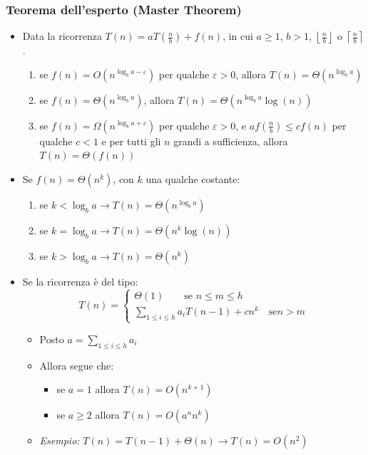 \documentclass[10pt,a4paper]{article}
\begin{document}
\subsubsection*{Teorema dell'esperto (Master Theorem)}
\begin{itemize}
    \item Data la ricorrenza $T(n) = aT(\frac{n}{b}) + f(n)$, in cui $a\ge1$, $b>1$, $\left\lfloor\frac{n}{b}\right\rfloor$ o $\left\lceil\frac{n}{b}\right\rceil$.
    \begin{enumerate}
        \item se $f(n) = O\left(n^{\log_ba-\varepsilon}\right)$ per qualche $\varepsilon>0$, allora $T(n)=\varTheta\left(n^{\log_ba}\right)$
        \item se $f(n) = \varTheta\left(n^{\log_ba}\right)$, allora $T(n)=\varTheta\left(n^{\log_ba}\log(n)\right)$
        \item se $f(n) = \varOmega\left(n^{\log_ba+\varepsilon}\right)$ per qualche $\varepsilon>0$, e $af\left(\frac{n}{b}\right)\le cf(n)$ per qualche $c<1$ e per tutti gli $n$ grandi a sufficienza, allora $T(n)=\varTheta(f(n))$
    \end{enumerate}
    \item Se $f(n) = \varTheta\left(n^k\right)$, con $k$ una qualche costante:
    \begin{enumerate}
        \item se $k < \log_ba \rightarrow T(n) = \varTheta\left(n^{\log_ba}\right)$
        \item se $k = \log_ba \rightarrow T(n) = \varTheta\left(n^k\log(n)\right)$
        \item se $k > \log_ba \rightarrow T(n) = \varTheta\left(n^k\right)$
    \end{enumerate}
    \item Se la ricorrenza \`e del tipo:
    \begin{equation*}
        T(n) = \begin{cases}
            \varTheta(1)\qquad \text{se } n \le m \le h\\
            \sum_{1\le i \le h} a_i T(n-1) + cn^k \quad \text{se} n>m
        \end{cases}
    \end{equation*}
    \begin{itemize}
        \item Posto $a = \sum_{1\le i \le h} a_i$
        \item Allora segue che:
        \begin{itemize}
            \item se $a = 1$ allora $T(n) = O(n^{k+1})$
            \item se $a \ge 2$ allora $T(n) = O(a^nn^k)$ 
        \end{itemize}
        \item \emph{Esempio:} $T(n)=T(n-1)+\varTheta(n) \rightarrow T(n)=O(n^2)$
    \end{itemize}
\end{itemize}
\vfill
\end{document}
